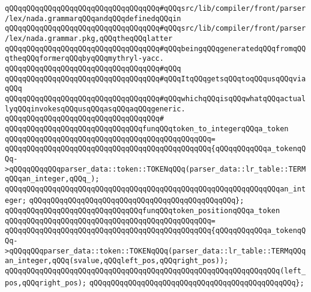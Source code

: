\verb|qQQqqQQqqQQqqQQqqQQqqQQqqQQqqQQqqQQq#qQQqsrc/lib/compiler/front/parser/lex/nada.grammarqQQqandqQQqdefinedqQQqin|\newline
\verb|qQQqqQQqqQQqqQQqqQQqqQQqqQQqqQQqqQQq#qQQqsrc/lib/compiler/front/parser/lex/nada.grammar.pkg,qQQqtheqQQqlatter|\newline
\verb|qQQqqQQqqQQqqQQqqQQqqQQqqQQqqQQqqQQq#qQQqbeingqQQqgeneratedqQQqfromqQQqtheqQQqformerqQQqbyqQQqmythryl-yacc.|\newline
\verb|qQQqqQQqqQQqqQQqqQQqqQQqqQQqqQQqqQQq#qQQq|\newline
\verb|qQQqqQQqqQQqqQQqqQQqqQQqqQQqqQQqqQQq#qQQqItqQQqgetsqQQqtoqQQqusqQQqviaqQQq|\newline
\verb|qQQqqQQqqQQqqQQqqQQqqQQqqQQqqQQqqQQq#qQQqwhichqQQqisqQQqwhatqQQqactuallyqQQqinvokesqQQqusqQQqasqQQqaqQQqgeneric.|\newline
\verb|qQQqqQQqqQQqqQQqqQQqqQQqqQQqqQQqqQQq#|\newline
\verb|qQQqqQQqqQQqqQQqqQQqqQQqqQQqqQQqfunqQQqtoken_to_integerqQQqa_token|\newline
\verb|qQQqqQQqqQQqqQQqqQQqqQQqqQQqqQQqqQQqqQQqqQQqqQQq=|\newline
\verb|qQQqqQQqqQQqqQQqqQQqqQQqqQQqqQQqqQQqqQQqqQQqqQQq{qQQqqQQqqQQqa_tokenqQQq->qQQqqQQqqQQqparser_data::token::TOKENqQQq(parser_data::lr_table::TERMqQQqan_integer,qQQq_);|\newline
\newline
\verb|qQQqqQQqqQQqqQQqqQQqqQQqqQQqqQQqqQQqqQQqqQQqqQQqqQQqqQQqqQQqqQQqan_integer;|\newline
\verb|qQQqqQQqqQQqqQQqqQQqqQQqqQQqqQQqqQQqqQQqqQQqqQQq};|\newline
\newline
\verb|qQQqqQQqqQQqqQQqqQQqqQQqqQQqqQQqfunqQQqtoken_positionqQQqa_token|\newline
\verb|qQQqqQQqqQQqqQQqqQQqqQQqqQQqqQQqqQQqqQQqqQQqqQQq=|\newline
\verb|qQQqqQQqqQQqqQQqqQQqqQQqqQQqqQQqqQQqqQQqqQQqqQQq{qQQqqQQqqQQqa_tokenqQQq->qQQqqQQqparser_data::token::TOKENqQQq(parser_data::lr_table::TERMqQQqan_integer,qQQq(svalue,qQQqleft_pos,qQQqright_pos));|\newline
\newline
\verb|qQQqqQQqqQQqqQQqqQQqqQQqqQQqqQQqqQQqqQQqqQQqqQQqqQQqqQQqqQQqqQQq(left_pos,qQQqright_pos);|\newline
\verb|qQQqqQQqqQQqqQQqqQQqqQQqqQQqqQQqqQQqqQQqqQQqqQQq};|\newline
